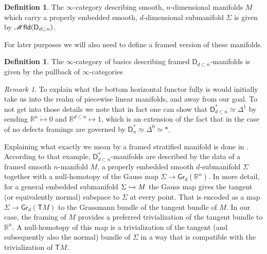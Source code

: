 \documentclass[12pt,a4paper]{article}
\newcounter{counter} \numberwithin{counter}{section}
\theoremstyle{definition}
\newtheorem{definition}[counter]{Definition}
\theoremstyle{plain}
\theoremstyle{remark}
\newtheorem{remark}[counter]{Remark}
\newcommand{\mfld}[1][s]{%
    \ifx r#1\mathsf{Mfld}\else
    \ifx s#1\mathscr{M} \mathsf{fld}\else
    \mathrm{Illegal~option}%
    \fi\fi
}
\begin{document}
\begin{definition}\label{def:mfld_disk_dn}
    The $\infty$-category describing smooth, $n$-dimensional manifolds $M$ which carry a properly embedded smooth, $d$-dimensional submanifold $\Sigma$ is given by $\mfld(\mathsf{D}_{d \subset n})$.
\end{definition}

For later purposes we will also need to define a framed version of these manifolds.

\begin{definition}\label{def:framed_d_under_n_sructure}
    The $\infty$-category of basics describing framed $\mathsf{D}_{d \subset n}$-manifolds is given by the pullback of $\infty$-categories
    \begin{center}
    \end{center}
\end{definition}

\begin{remark}
    To explain what the bottom horizontal functor fully is would initially take us into the realm of piecewise linear manifolds, and away from our goal. To not get into those details we note that in fact one can show that $\mathsf{D}_{d \subset n}^* \simeq \Delta^1$ by sending $\mathbb{R}^n \mapsto 0$ and $\mathbb{R}^{d \subset n} \mapsto 1$, which is an extension of the fact that in the case of no defects framings are governed by $ \mathsf{D}_n^* \simeq \Delta^0 \simeq *$.

    Explaining what exactly we mean by a framed stratified manifold is done in \cite[ex.5.2.12]{aft_localstrut}. According to that example, $\mathsf{D}_{d \subset n}^*$-manifolds are described by the data of a framed smooth $n$-manifold $M$, a properly embedded smooth $d$-submanifold $\Sigma$ together with a null-homotopy of the Gauss map $\Sigma \rightarrow \mathsf{Gr}_d(\mathbb{R}^n)$. In more detail, for a general embedded submanifold $\Sigma \xhookrightarrow{} M$ the Gauss map gives the tangent (or equivalently normal) subspace to $\Sigma$ at every point. That is encoded as a map $\Sigma \rightarrow \mathsf{Gr}_d(\mathsf{T}M)$ to the Grassmann bundle of the tangent bundle of $M$. In our case, the framing of $M$ provides a preferred trivialization of the tangent bundle to $\mathbb{R}^n$. A null-homotopy of this map is a trivialization of the tangent (and subsequently also the normal) bundle of $\Sigma$ in a way that is compatible with the trivialization of $\mathsf{T}M$.
\end{remark}
\end{document}
